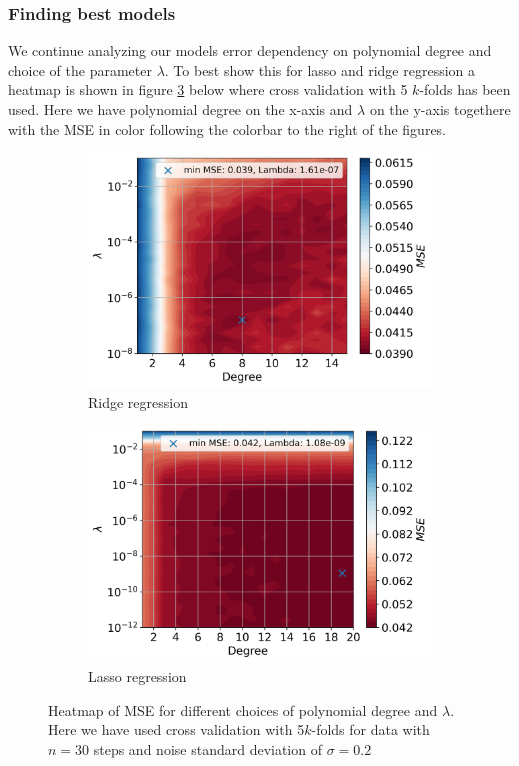 \documentclass[12pt]{article}
\begin{document}
\subsubsection{Finding best models}
We continue analyzing our models error dependency on polynomial degree and choice of the parameter $\lambda$. To best show this for lasso and ridge regression a heatmap is shown in figure \ref{fig:heat_franke} below where cross validation with 5 $k$-folds has been used. Here we have polynomial degree on the x-axis and $\lambda$ on the y-axis togethere with the MSE in color following the colorbar to the right of the figures.
\begin{figure}[H]

  \begin{subfigure}{.5\textwidth}
    \centering
    \includegraphics[width=\textwidth]{../figures/best_lambda_RIDGE_02.png}
    \caption{Ridge regression}
    \label{fig:}
  \end{subfigure}
  \begin{subfigure}{.5\textwidth}
    \centering
    \includegraphics[width=\textwidth]{../figures/best_lambda_LASSO_02.png}
    \caption{Lasso regression}
    \label{fig:}
  \end{subfigure}
  \caption{Heatmap of MSE for different choices of polynomial degree and $\lambda$. Here we have used cross validation with 5$k$-folds for data with $n=30$ steps and noise standard deviation of $\sigma=0.2$}
  \label{fig:heat_franke}
\end{figure}
\end{document}
